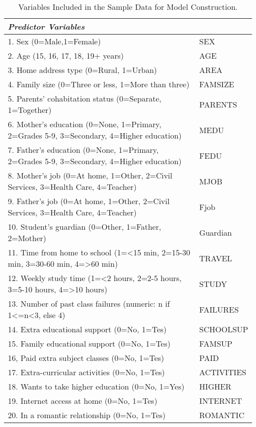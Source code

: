 \documentclass[sigconf]{acmart}
\begin{document}
\begin{table*}[ht]
  \caption{Variables Included in the Sample Data for Model Construction.}
  \label{tab:freq}
  \begin{tabular}{ll}
    \toprule
    \textit{Predictor Variables} &    \\
    \midrule
    1. Sex (0=Male,1=Female) & SEX  \\  
    2. Age (15, 16, 17, 18, 19+ years) & AGE  \\
    3. Home address type (0=Rural, 1=Urban) & AREA  \\
    4. Family size (0=Three or less, 1=More than three) & FAMSIZE  \\
    5. Parents' cohabitation status (0=Separate, 1=Together) & PARENTS  \\ 
    6. Mother's education (0=None, 1=Primary, 2=Grades 5-9,  3=Secondary, 4=Higher education) & MEDU  \\
    7. Father's education (0=None, 1=Primary, 2=Grades 5-9,  3=Secondary, 4=Higher education) & FEDU  \\
    8. Mother's job (0=At home, 1=Other, 2=Civil Services, 3=Health Care, 4=Teacher) & MJOB  \\
    9. Father's job (0=At home, 1=Other, 2=Civil Services, 3=Health Care, 4=Teacher) & Fjob  \\
    10. Student's guardian (0=Other, 1=Father, 2=Mother) & Guardian  \\
    11. Time from home to school (1=<15 min, 2=15-30 min, 3=30-60 min, 4=>60 min) & TRAVEL  \\
    12. Weekly study time (1=<2 hours, 2=2-5 hours, 3=5-10 hours, 4=>10 hours) & STUDY  \\
    13. Number of past class failures (numeric: n if 1<=n<3, else 4) & FAILURES  \\
    14. Extra educational support (0=No, 1=Tes) & SCHOOLSUP  \\
    15. Family educational support (0=No, 1=Tes) & FAMSUP  \\
    16, Paid extra subject classes (0=No, 1=Tes) & PAID  \\
    17. Extra-curricular activities (0=No, 1=Tes) & ACTIVITIES  \\
    18. Wants to take higher education (0=No, 1=Yes) & HIGHER  \\
    19. Internet access at home (0=No, 1=Tes) & INTERNET  \\
    20. In a romantic relationship (0=No, 1=Tes) & ROMANTIC  \\

\end{tabular}
\end{table*}
\end{document}
